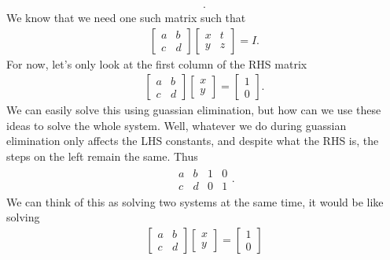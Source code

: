 \documentclass{report}
\begin{document}
\begin{itemize}
\begin{align*}
                .\end{align*}
                We know that we need one such matrix such that
                \begin{align*}
                    \begin{bmatrix} a & b \\ c & d\end{bmatrix}\begin{bmatrix} x & t \\ y & z\end{bmatrix}  = I
                .\end{align*}
                For now, let's only look at the first column of the RHS matrix
                \begin{align*}
                    \begin{bmatrix} a & b \\ c & d\end{bmatrix} \begin{bmatrix} x \\ y \end{bmatrix} = \begin{bmatrix} 1 \\ 0 \end{bmatrix}
                .\end{align*}
                We can easily solve this using guassian elimination, but how can we use these ideas to solve the whole system. Well, whatever we do during guassian elimination only affects the LHS constants, and despite what the RHS is, the steps on the left remain the same. Thus
                \begin{align*}
                    \begin{array}{cc|cc}
                        a & b & 1 & 0 \\
                        c & d & 0 & 1
                    \end{array}
                .\end{align*}
                We can think of this as solving two systems at the same time, it would be like solving 
                \begin{align*}
                    \begin{bmatrix} a & b \\ c & d \end{bmatrix} \begin{bmatrix} x \\ y \end{bmatrix} = \begin{bmatrix} 1 \\ 0 \end{bmatrix} \\

\end{align*}
\end{itemize}
\end{document}
